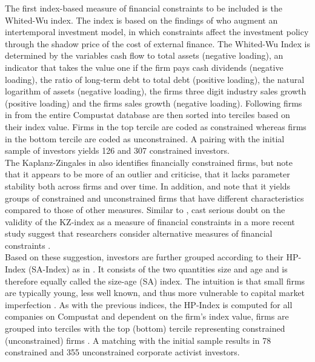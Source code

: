 \documentclass[12pt]{article}
\begin{document}
The first index-based measure of financial constraints to be included is the Whited-Wu index. The index is based on the findings of \citet[p.543]{Whited2006} who augment an intertemporal investment model, in which constraints affect the investment policy through the shadow price of the cost of external finance. The Whited-Wu Index is determined by the variables cash flow to total assets (negative loading), an indicator that takes the value one if the firm pays cash dividends (negative loading), the ratio of long-term debt to total debt (positive loading), the natural logarithm of assets (negative loading), the firms three digit industry sales growth (positive loading) and the firms sales growth (negative loading). Following \citet[p.38]{Farre-mensa2013} firms in from the entire Compustat database are then sorted into terciles based on their index value. Firms in the top tercile are coded as constrained whereas firms in the bottom tercile are coded as unconstrained. A pairing with the initial sample of investors yields 126 and 307 constrained investors.\\
The Kaplanz-Zingales in also identifies financially constrained firms, but \citet[p.29]{Farre-mensa2013} note that it appears to be more of an outlier and \citet{Whited2006} criticise, that it lacks parameter stability both across firms and over time. In addition, \citet[p.111]{Khatami2014} and \citet[p.1779]{Almeida2004} note that it yields groups of constrained and unconstrained firms that have different characteristics compared to those of other measures. Similar to \citet[p.546]{Whited2006}, \citet[p.1909]{hadlock2010} cast serious doubt on the validity of the KZ-index as a measure of financial constraints in a more recent study suggest that researchers consider alternative measures of financial constraints \citep[p.1938]{hadlock2010}.\\
Based on these suggestion, investors are further grouped according to their HP-Index (SA-Index) as in \citet[p.1929]{hadlock2010}. It consists of the two quantities size and age and is therefore equally called the size-age (SA) index. The intuition is that small firms are typically young, less well known, and thus more vulnerable to capital market imperfection \citep[p.1790]{Almeida2004}. As with the previous indices, the HP-Index is computed for all companies on Compustat and dependent on the firm's index value, firms are grouped into terciles with the top (bottom) tercile representing constrained (unconstrained) firms \citep[p.29]{Farre-mensa2013}. A matching with the initial sample results in 78 constrained and 355 unconstrained corporate activist investors. 
\end{document}
